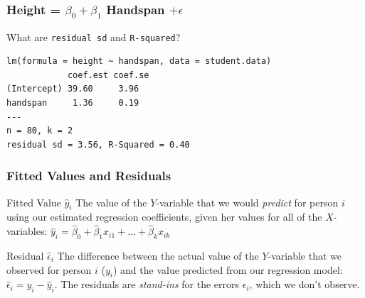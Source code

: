 \documentclass[handout]{beamer}
\begin{document}
\begin{frame}[fragile]
\frametitle{Height = $\beta_0 + \beta_1$ Handspan $+ \epsilon$}
\alert{What are \texttt{residual sd} and \texttt{R-squared}?}
\footnotesize
\begin{verbatim}
lm(formula = height ~ handspan, data = student.data)
            coef.est coef.se
(Intercept) 39.60     3.96  
handspan     1.36     0.19  
---
n = 80, k = 2
residual sd = 3.56, R-Squared = 0.40
\end{verbatim}
\end{frame}

\begin{frame}
\frametitle{Fitted Values and Residuals}

\begin{block}{Fitted Value $\widehat{y}_i$}
The value of the $Y$-variable that we would \emph{predict} for person $i$ using our estimated regression coefficients, given her values for all of the $X$-variables: \alert{$\widehat{y}_i = \widehat{\beta}_0 + \widehat{\beta}_1 x_{i1} + \hdots + \widehat{\beta}_k x_{ik}$}
\end{block}


\begin{block}{Residual $\widehat{\epsilon}_i$}
The difference between the actual value of the $Y$-variable that we observed for person $i$ ($y_i$) and the value predicted from our regression model: \alert{$\widehat{\epsilon}_i = y_i - \widehat{y}_i$}. The residuals are \emph{stand-ins} for the errors $\epsilon_i$, which we don't observe.
\end{block}

\end{frame}
\end{document}
